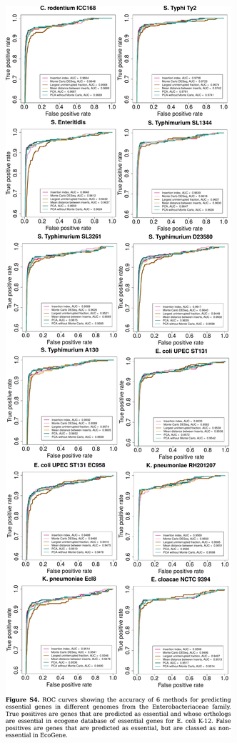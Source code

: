 \documentclass{article}
\newcommand{\Newpage}{\end{preview}\begin{preview}}
\begin{document}
\begin{preview}
\Newpage
\includegraphics{suppl4.pdf}
\Newpage

\end{preview}
\end{document}
